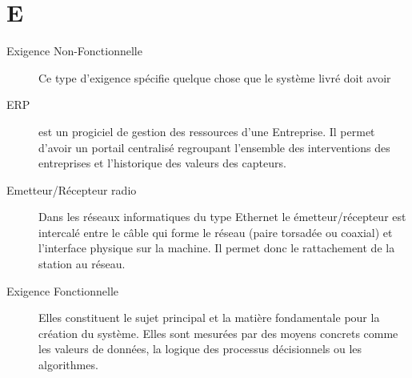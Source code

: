 \section{E}

\begin{description}

\item[Exigence Non-Fonctionnelle] Ce type d'exigence spécifie quelque chose que 
le système livré doit avoir

\item[ERP] est un progiciel de gestion des ressources d'une Entreprise. 
Il permet d'avoir un portail centralisé regroupant l'ensemble des interventions 
des entreprises et l'historique des valeurs des capteurs.

\item[Emetteur/Récepteur radio]
Dans les réseaux informatiques du type Ethernet le émetteur/récepteur est 
intercalé entre le câble qui forme le réseau (paire torsadée ou coaxial) et 
l'interface physique sur la machine. Il permet donc le rattachement de la 
station au réseau.

\item[Exigence Fonctionnelle]
Elles constituent le sujet principal et la matière fondamentale pour la création 
du système. Elles sont mesurées par des moyens concrets comme les valeurs de données, 
la logique des processus décisionnels ou les algorithmes.

\end{description}
